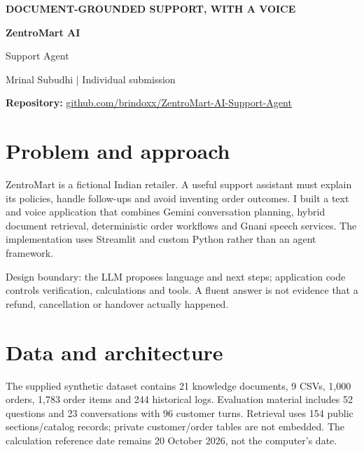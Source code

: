\documentclass[10pt,a4paper]{article}
\newcommand{\tagline}[1]{{\small\bfseries\color{teal}#1}\par}
\newcommand{\note}[1]{\par\noindent\colorbox{mint}{\parbox{\dimexpr\linewidth-2\fboxsep}{\small #1}}\par}
\newcommand{\repo}{\href{https://github.com/brindoxx/ZentroMart-AI-Support-Agent}{github.com/brindoxx/ZentroMart-AI-Support-Agent}}
\begin{document}
\tagline{DOCUMENT-GROUNDED SUPPORT, WITH A VOICE}
{\fontsize{27}{31}\selectfont\bfseries\color{navy}ZentroMart AI\par Support Agent}\par
{\large\color{muted}Mrinal Subudhi | Individual submission}\par
\textbf{Repository:} \repo

\section{Problem and approach}
ZentroMart is a fictional Indian retailer. A useful support assistant must explain
its policies, handle follow-ups and avoid inventing order outcomes. I built a
text and voice application that combines Gemini conversation planning, hybrid
document retrieval, deterministic order workflows and Gnani speech services.
The implementation uses Streamlit and custom Python rather than an agent framework.

\note{Design boundary: the LLM proposes language and next steps; application code
controls verification, calculations and tools. A fluent answer is not evidence
that a refund, cancellation or handover actually happened.}

\section{Data and architecture}
The supplied synthetic dataset contains 21 knowledge documents, 9 CSVs, 1,000
orders, 1,783 order items and 244 historical logs. Evaluation material includes
52 questions and 23 conversations with 96 customer turns. Retrieval uses 154
public sections/catalog records; private customer/order tables are not embedded.
The calculation reference date remains 20 October 2026, not the computer's date.

\begin{center}
\end{center}
\end{document}
